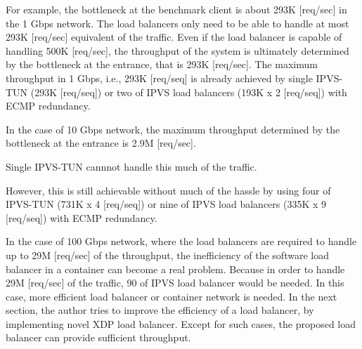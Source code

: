For example, the bottleneck at the benchmark client is about 293K [req/sec] in the 1 Gbps network. 
The load balancers only need to be able to handle at most 293K [req/sec] equivalent of the traffic.
Even if the load balancer is capable of handling 500K [req/sec], the throughput of the system is ultimately determined by the bottleneck at the entrance, that is 293K [req/sec].
The maximum throughput in 1 Gbps, i.e., 293K [req/seq] is already achieved by single IPVS-TUN (293K [req/seq]) or two of IPVS load balancers (193K x 2 [req/seq]) with ECMP redundancy.

In the case of 10 Gbps network, the maximum throughput determined by the bottleneck at the entrance is 2.9M [req/sec].

  Single IPVS-TUN cannnot handle this much of the traffic.

However, this is still  achievable without much of the hassle by using four of IPVS-TUN (731K x 4 [req/seq]) or nine of IPVS load balancers (335K x 9 [req/seq]) with ECMP redundancy.

In the case of 100 Gbps network, where the load balancers are required to handle up to 29M [req/sec] of the throughput, the inefficiency of the software load balancer in a container can become a real problem.
Because in order to handle 29M [req/sec] of the traffic, 90 of IPVS load balancer would be needed.
In this case, more efficient load balancer or container network is needed.
In the next section, the author tries to improve the efficiency of a load balancer, by implementing novel XDP load balancer.
Except for such cases, the proposed load balancer can provide sufficient throughput.

